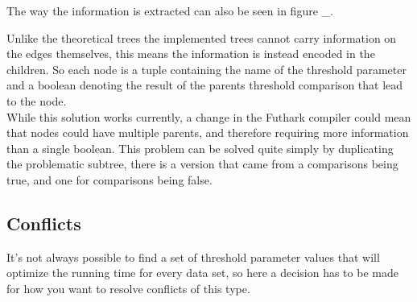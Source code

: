 The way the information is extracted can also be seen in figure \_. 

Unlike the theoretical trees the implemented trees cannot carry information on
the edges themselves, this means the information is instead encoded in the
children. So each node is a tuple containing the name of the threshold
parameter and a boolean denoting the result of the parents threshold
comparison that lead to the node.\\
While this solution works currently, a change in the Futhark compiler could
mean that nodes could have multiple parents, and therefore requiring more
information than a single boolean. This problem can be solved quite simply by
duplicating the problematic subtree, there is a version that came from a
comparisons being true, and one for comparisons being false.



\subsection{Conflicts}
It's not always possible to find a set of threshold parameter values that will
optimize the running time for every data set, so here a decision has to be made
for how you want to resolve conflicts of this type.
